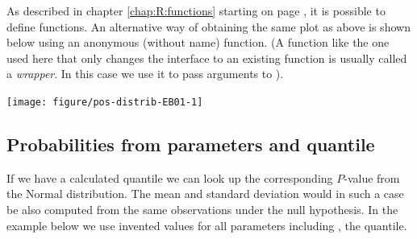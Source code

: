 \documentclass[krantz2]{krantz}\usepackage{knitr}%
\begin{document}
\begin{explainbox}
As described in chapter \ref{chap:R:functions} starting on page \pageref{chap:R:functions}, it is possible to define functions. An alternative way of obtaining the same plot as above is shown below using an anonymous (without name) function. (A function like the one used here that only changes the interface to an existing function is usually called a \emph{wrapper}. In this case we use it to pass arguments to ).

\begin{knitrout}\footnotesize
{}\color{fgcolor}\begin{kframe}
\begin{alltt}
\hlstd{(} \hlstd{=} \hlstd{(}\hlstd{)}   \hlstd{=} \hlstd{,}  \hlstd{=} \hlstd{),}
      \hlstd{=} \hlopt{-}\hlstd{,}  \hlstd{=} \hlstd{,}  \hlstd{=} \hlstd{)}
\end{alltt}
\end{kframe}

{\centering \texttt{[image: figure/pos-distrib-EB01-1]} 

}



\end{knitrout}
\end{explainbox}

\subsection{Probabilities from parameters and quantile}\label{sec:prob:quant}

If we have a calculated quantile we can look up the corresponding $P$-value from the Normal distribution. The mean and standard deviation would in such a case be also computed from the same observations under the null hypothesis. In the example below we use invented values for all parameters including , the quantile.
\end{document}
